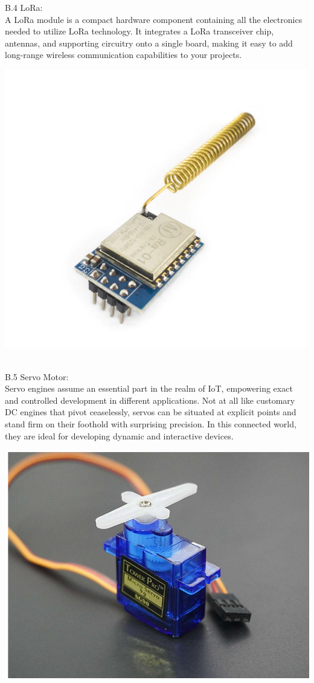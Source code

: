 \documentclass[conference, onecolumn]{IEEEtran}
\begin{document}
B.4 LoRa:\\
A LoRa module is a compact hardware component containing all the electronics needed to utilize LoRa technology. It integrates a LoRa transceiver chip, antennas, and supporting circuitry onto a single board, making it easy to add long-range wireless communication capabilities to your projects.\\
\centerline{\includegraphics[width=3.8 in]{lora}}\\



B.5 Servo Motor:\\
Servo engines assume an essential part in the realm of IoT, empowering exact and controlled development in different applications. Not at all like customary DC engines that pivot ceaselessly, servos can be situated at explicit points and stand firm on their foothold with surprising precision. In this connected world, they are ideal for developing dynamic and interactive devices.\\
\centerline{\includegraphics[width=3.8 in]{servo}}\\
\end{document}
